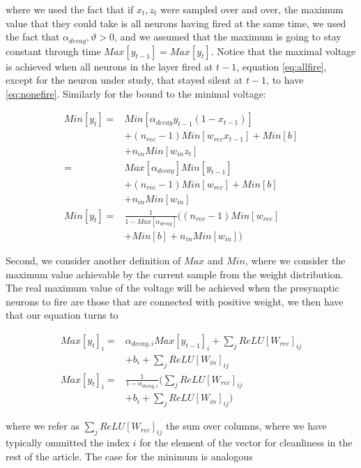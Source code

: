 \noindent where we used the fact that if $x_t, z_t$ were sampled over and over, the maximum value that they could take is all neurons having fired at the same time, 
we used the fact that $\alpha_{decay}, \vartheta>0$, and we assumed that the maximum is going to stay constant through time $Max[y_{t-1}]=Max[y_{t}]$. Notice that the maximal voltage is achieved when all neurons in the layer fired at $t-1$, equation \ref{eq:allfire}, except for the neuron under study, that stayed silent at $t-1$, to have \ref{eq:nonefire}. Similarly for the bound to the minimal voltage:

\begin{align}
    Min[y_t] =& Min[\alpha_{decay} y_{t-1}(1-x_{t-1})] \nonumber \\&+ (n_{rec}-1)Min[w_{rec}x_{t-1}] + Min[b] \\
    &+ n_{in} Min[w_{in}z_t] \\
    =& Max[\alpha_{decay}]Min[ y_{t-1}] \nonumber \\&+ (n_{rec}-1)Min[w_{rec}] + Min[b] \\&+ n_{in}Min[w_{in}]\\
    Min[y_t] =& \frac{1}{1-Max[\alpha_{decay}]}\Big( (n_{rec}-1)Min[w_{rec}] \nonumber \\&+ Min[b]  + n_{in}Min[w_{in}]\Big) 
\end{align}


Second, we consider another definition of $Max$ and $Min$, where we consider the maximum value achievable by the current sample from the weight distribution. The real maximum value of the voltage will be achieved when the presynaptic neurons to fire are those that are connected with positive weight, we then have that our equation turns to


\begin{align}
    Max[y_t]_i =& \alpha_{decay, i} Max[y_{t-1}]_i + \sum_j ReLU[W_{rec}]_{ij} \nonumber \\&+ b_i + \sum_j ReLU[W_{in}]_{ij} \\
    Max[y_t]_i =& \frac{1}{1-\alpha_{decay,i}}\Big(\sum_j ReLU[W_{rec}]_{ij} \nonumber \\&+ b_i + \sum_j ReLU[W_{in}]_{ij}\Big) 
\end{align}

\noindent where we refer as $\sum_{j} ReLU[W_{rec}]_{ij}$ the sum over columns, where we have typically ommitted the index $i$ for the element of the vector for cleanliness in the rest of the article. The case for the minimum is analogous


